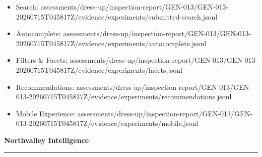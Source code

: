 \documentclass[10pt]{article}
\newcommand{\ReportFine}[1]{{\fontsize{7.6}{9.1}\selectfont\color{NVIMuted}#1}}
\begin{document}
\begin{itemize}
\item \ReportFine{Search: assessments/dress-up/inspection-report/GEN-013/GEN-013-20260715T045817Z/evidence/experiments/submitted-search.jsonl}
\item \ReportFine{Autocomplete: assessments/dress-up/inspection-report/GEN-013/GEN-013-20260715T045817Z/evidence/experiments/autocomplete.jsonl}
\item \ReportFine{Filters \& Facets: assessments/dress-up/inspection-report/GEN-013/GEN-013-20260715T045817Z/evidence/experiments/facets.jsonl}
\item \ReportFine{Recommendations: assessments/dress-up/inspection-report/GEN-013/GEN-013-20260715T045817Z/evidence/experiments/recommendations.jsonl}
\item \ReportFine{Mobile Experience: assessments/dress-up/inspection-report/GEN-013/GEN-013-20260715T045817Z/evidence/experiments/mobile.jsonl}
\end{itemize}
\vfill
\begin{center}
{\fontsize{16}{19}\selectfont\bfseries\color{NVIInk}Northvalley Intelligence}\\[0.06in]
{\color{NVIAccent}\rule{2.2in}{0.8pt}}\\[0.08in]
\ReportFine{\NorthvalleyContactLine}
\end{center}
\end{document}
